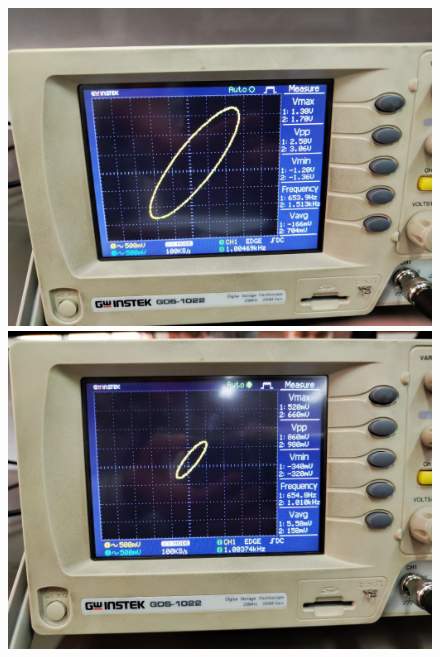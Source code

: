 \documentclass[11pt]{article}
\begin{document}
\begin{question}
{\begin{figure}[H]
\begin{center}
                \includegraphics[scale=0.15]{Fig/77.jpeg}
                \includegraphics[scale=0.15]{Fig/78.jpeg}
            \end{center}
        \end{figure}
    }

\end{question}



\end{document}
